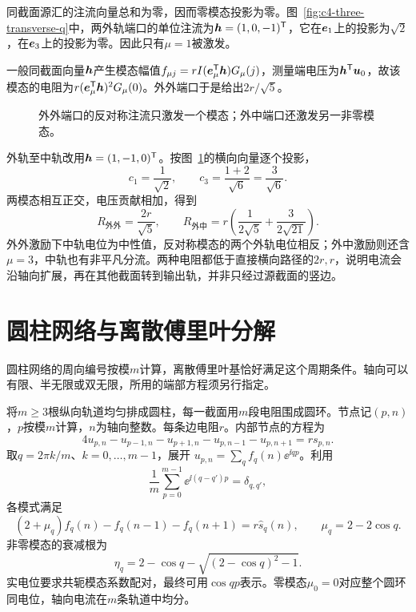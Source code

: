 \begin{solution}
同截面源汇的注流向量总和为零，因而零模态投影为零。图~\ref{fig:c4-three-transverse-q}中，两外轨端口的单位注流为$\bm{h}=(1,0,-1)^{\mathsf T}$，它在$\bm{e}_1$上的投影为$\sqrt2$，在$\bm{e}_3$上的投影为零。因此只有$\mu=1$被激发。

一般同截面向量$\bm{h}$产生模态幅值$f_{\mu j}=rI(\bm{e}_\mu^{\mathsf T}\bm{h})G_\mu(j)$，测量端电压为$\bm{h}^{\mathsf T}\bm{u}_0$，故该模态的电阻为$r(\bm{e}_\mu^{\mathsf T}\bm{h})^2G_\mu(0)$。外外端口于是给出$2r/\sqrt5$。
\begin{figure}[H]\centering
{}
\caption{外外端口的反对称注流只激发一个模态；外中端口还激发另一非零模态。}\label{fig:c4-three-transverse-s}
\end{figure}
外轨至中轨改用$\bm{h}=(1,-1,0)^{\mathsf T}$。按图~\ref{fig:c4-three-transverse-s}的横向向量逐个投影，
\[
 c_1=\frac1{\sqrt2},\qquad
 c_3=\frac{1+2}{\sqrt6}=\frac3{\sqrt6}.
\]
两模态相互正交，电压贡献相加，得到
\[
 \boxed{R_{\text{外外}}=\frac{2r}{\sqrt5}},\qquad
 \boxed{R_{\text{外中}}=r\left(\frac1{2\sqrt5}+\frac3{2\sqrt{21}}\right)}.
\]
外外激励下中轨电位为中性值，反对称模态的两个外轨电位相反；外中激励则还含$\mu=3$，中轨也有非平凡分流。两种电阻都低于直接横向路径的$2r,r$，说明电流会沿轴向扩展，再在其他截面转到输出轨，并非只经过源截面的竖边。
\end{solution}

\section{圆柱网络与离散傅里叶分解}\label{sec:c4-fourier}
圆柱网络的周向编号按模$m$计算，离散傅里叶基恰好满足这个周期条件。轴向可以有限、半无限或双无限，所用的端部方程须另行指定。

将$m\ge3$根纵向轨道均匀排成圆柱，每一截面用$m$段电阻围成圆环。节点记$(p,n)$，$p$按模$m$计算，$n$为轴向整数。每条边电阻$r$。内部节点的方程为
\[
 4u_{p,n}-u_{p-1,n}-u_{p+1,n}-u_{p,n-1}-u_{p,n+1}
 =rs_{p,n}.
\]
取$q=2\pi k/m$、$k=0,\ldots,m-1$，展开
$u_{p,n}=\sum_q f_q(n)\ee^{\ii qp}$。利用
\[
 \frac1m\sum_{p=0}^{m-1}\ee^{\ii(q-q')p}=\delta_{q,q'},
\]
各模式满足
\[
 (2+\mu_q)f_q(n)-f_q(n-1)-f_q(n+1)=r\widehat s_q(n),
 \qquad\mu_q=2-2\cos q.
\]
非零模态的衰减根为
\[
 \eta_q=2-\cos q-\sqrt{(2-\cos q)^2-1}.
\]
实电位要求共轭模态系数配对，最终可用$\cos qp$表示。零模态$\mu_0=0$对应整个圆环同电位，轴向电流在$m$条轨道中均分。

